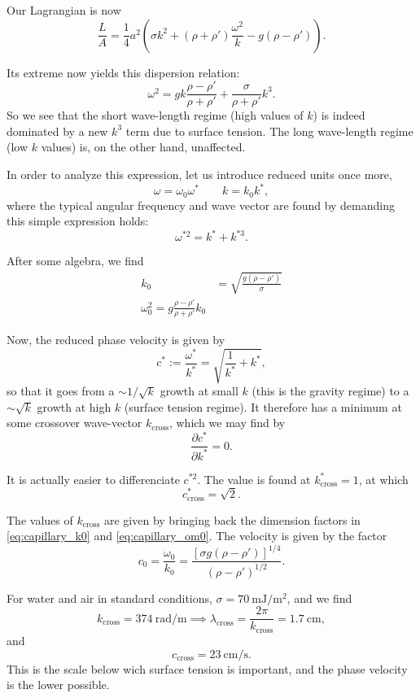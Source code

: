 Our Lagrangian is now
\[
  \frac{L}{A} = \frac14 a^2
  \left(
    \sigma  k^2 + 
    (\rho+\rho') \frac{ \omega^2  }{ k } -
    g (\rho-\rho')
  \right) .
\]

Its extreme now yields this dispersion relation:
\[
  \omega^2  =    g  k \frac{\rho-\rho'}{\rho + \rho'} +
  \frac{\sigma}{\rho+\rho'} k^3 .
\]
So we see that the short wave-length regime (high values of $k$) is
indeed dominated by a new $k^3$ term due to surface tension. The long
wave-length regime (low $k$ values) is, on the other hand, unaffected.

In order to analyze this expression, let us introduce reduced units
once more,
\[
\omega=\omega_0 \omega^* \qquad k = k_0 k^* ,
\]
where the typical angular frequency and wave vector are found by
demanding this simple expression holds:
\[
\omega^{*2}= k^* + k^{*3} .
\]

After some algebra, we find
\begin{align}
  \label{eq:capillary_k0}
  k_0&=\sqrt{\frac{ g (\rho-\rho') }{ \sigma }} \\
  \label{eq:capillary_om0}
  \omega_0^2 = g  \frac{ \rho-\rho' }{ \rho + \rho' } k_0
\end{align}


Now, the reduced phase velocity is given by
\[
  c^* := \frac{\omega^*}{k^*} =
  \sqrt{\frac{1}{k^*} +  k^* } ,
\]
so that it goes from a $\sim 1/\sqrt{k} $ growth at small $k$ (this is
the gravity regime) to a $\sim \sqrt{k} $ growth at high $k$ (surface
tension regime). It therefore has a minimum at some crossover
wave-vector $k_\mathrm{cross}$, which we may find by
\[
\frac{\partial c^* }{\partial k^*} = 0 .
\]

It is actually easier to differenciate $c^{*2}$. The value is found at
$k^*_\mathrm{cross} = 1$, at which
\[
c^*_\mathrm{cross} = \sqrt{2} .
\]

The values of $k_\mathrm{cross} $ are given by bringing back the
dimension factors in \ref{eq:capillary_k0} and \ref{eq:capillary_om0}.
The velocity is given by the factor
\[
  c_0 = \frac{\omega_0}{k_0} =
  \frac{[\sigma g (\rho-\rho')]^{1/4}}{(\rho-\rho')^{1/2}} .
\]

For water and air in standard conditions,
$\sigma=\SI{70}{\milli\joule\per\meter\squared}$,
and we find
\[
  k_\mathrm{cross} = \SI{374}{\radian\per\meter} \implies
  \lambda_\mathrm{cross} = \frac{2\pi}{k_\mathrm{cross}}=
  \SI{1.7}{\centi\meter} ,
\]
and
\[
  c_\mathrm{cross} =  \SI{23}{\centi\meter\per\second} .
\]
This is the scale below wich surface tension is important, and the
phase velocity is the lower possible.

